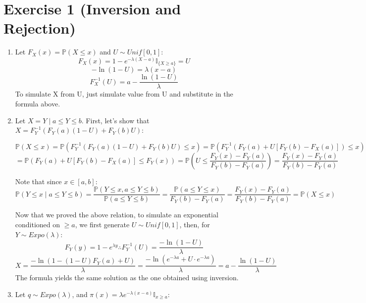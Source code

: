 \documentclass[12pt,letterpaper]{article}
\begin{document}

\section*{Exercise 1 (Inversion and Rejection)}
\begin{enumerate}[leftmargin=!,labelindent=5pt]
    \item Let $ F_X(x) = \mathbb{P}(X \leq x) $ and $U \sim Unif[0,1]$:
            $$ F_X(x) = 1 - e^{-\lambda(X-a)}\mathbb{I}_{\{X \geq a\}}=U $$
            $$ -\ln(1-U) = \lambda(x-a) $$
            $$ F_X^{-1}(U) = a - \frac{\ln(1-U)}{\lambda} $$
    To simulate X from U, just simulate value from U and substitute in the
    formula above.
        
    \item Let $X = Y \mid a \leq Y \leq b$.
    First, let's show that $X = F_Y^{-1}(F_Y(a)(1-U)+F_Y(b)U)$:

    $$\mathbb{P}(X \leq x) = \mathbb{P}(F_Y^{-1}(F_Y(a)(1-U)+F_Y(b)U)\leq x)
    = \mathbb{P}(F_Y^{-1}(F_Y(a)+U[F_Y(b)-F_X(a)])\leq x)$$
    $$ = \mathbb{P}(F_Y(a)+U[F_Y(b)-F_X(a)]\leq F_Y(x)) = 
    \mathbb{P}\left(U \leq \frac{F_Y(x) - F_Y(a)}{F_Y(b)-F_Y(a)}\right)
    =\frac{F_Y(x) - F_Y(a)}{F_Y(b)-F_Y(a)}$$

    Note that since $x \in [a,b]$: 
    $$\mathbb{P}(Y \leq x \mid a \leq Y \leq b)
    = \frac{\mathbb{P}(Y \leq x, a \leq Y \leq b)}
    {\mathbb{P}(a \leq Y \leq b)}
    =\frac{\mathbb{P}(a \leq Y \leq x)}{F_Y(b) - F_Y(a)}
    =\frac{F_Y(x) - F_Y(a)}{F_Y(b)-F_Y(a)} = \mathbb{P}(X \leq x)$$

    Now that we proved the above relation, to simulate an exponential
    conditioned on $\geq a$, we first generate $U \sim Unif[0,1]$, then,
    for $Y \sim Expo(\lambda)$:
    $$F_Y(y) = 1 - e^{\lambda y} \therefore F_Y^{-1}(U)
    = \frac{-\ln(1-U)}{\lambda}$$
    $$X = \frac{-\ln(1 - (1-U)F_Y(a)+U)}{\lambda} = 
    \frac{-\ln(e^{-\lambda a}+U\cdot e^{-\lambda a})}{\lambda}
    = a - \frac{\ln(1-U)}{\lambda}
    $$
    The formula yields the same solution as the one obtained using
    inversion.

    \item Let $q \sim Expo(\lambda)$, and
    $\pi(x) = \lambda e^{-\lambda(x-a)}\mathbb{I}_{x\geq a}$:


\end{enumerate}
\end{document}
